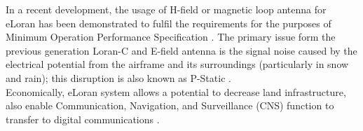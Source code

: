\noindent In a recent development, the usage of H-field or magnetic loop antenna for eLoran has been demonstrated to fulfil the requirements for the purposes of Minimum Operation Performance Specification \cite{Anonymous2016ELoranLight}. The primary issue form the previous generation Loran-C and E-field antenna is the signal noise caused by the electrical potential from the airframe and its surroundings (particularly in snow and rain); this disruption is also known as P-Static \cite{BartoneH-fieldApplications}.\\

\noindent Economically, eLoran system allows a potential to decrease land infrastructure, also enable Communication, Navigation, and Surveillance (CNS) function to transfer to digital communications \cite{InternationalLORANAssociation2007EnhancedApril}.\\